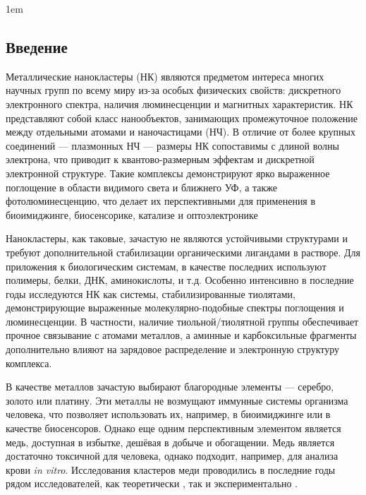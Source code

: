 \documentclass[a4paper,12pt]{article}
\begin{document}
	\emergencystretch 1em
	
	
	\ToC
	
	
	\begin{onehalfspace}
	
	\section*{Введение}
	
	Металлические нанокластеры (НК) являются предметом интереса многих научных групп по всему миру из-за особых физических свойств: дискретного электронного спектра, наличия люминесценции и магнитных характеристик. НК представляют собой класс нанообъектов, занимающих промежуточное положение между отдельными атомами и наночастицами (НЧ). В отличие от более крупных соединений — плазмонных НЧ — размеры НК сопоставимы с длиной волны электрона, что приводит к квантово-размерным эффектам и дискретной электронной структуре. Такие комплексы демонстрируют ярко выраженное поглощение в области видимого света и ближнего УФ, а также фотолюминесценцию, что делает их перспективными для применения в биоимиджинге, биосенсорике, катализе и оптоэлектронике \cite{Saisree2022}
	
	Нанокластеры, как таковые, зачастую не являются устойчивыми структурами и требуют дополнительной стабилизации органическими лигандами в растворе. Для приложения к биологическим системам, в качестве последних используют полимеры, белки, ДНК, аминокислоты, и т.д. Особенно интенсивно в последние годы исследуются НК как системы, стабилизированные тиолятами, демонстрирующие выраженные молекулярно-подобные спектры поглощения и люминесценции. В частности, наличие тиольной/тиолятной группы обеспечивает прочное связывание с атомами металлов, а аминные и карбоксильные фрагменты дополнительно влияют на зарядовое распределение и электронную структуру комплекса.
	
	В качестве металлов зачастую выбирают благородные элементы — серебро, золото или платину. Эти металлы не возмущают иммунные системы организма человека, что позволяет использовать их, например, в биоимиджинге или в качестве биосенсоров. Однако еще одним перспективным элементом является медь, доступная в избытке, дешёвая в добыче и обогащении. Медь является достаточно токсичной для человека, однако подходит, например, для анализа крови \textit{in vitro}. Исследования кластеров меди проводились в последние годы рядом исследователей, как теоретически \cite{Jug2002, Jabbar2021, Jaque2004, Jaque2002, Buglak2024, Buglak2019}, так и экспериментально \cite{Liu2021, Xue2021}.
	

\end{onehalfspace}
\end{document}
